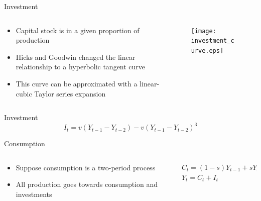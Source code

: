 \documentclass{beamer}
\begin{document}
\begin{frame}{Investment}
	\begin{columns}
		\begin{column}{0.5\textwidth}
				\begin{itemize}
					\item
						Capital stock is in a given proportion of production\autocite{Press1939}

					\item
						Hicks and Goodwin changed the linear relationship to a hyperbolic tangent curve
					\item
						This curve can be approximated with a linear-cubic Taylor series expansion
				\end{itemize}
		\end{column}
		\begin{column}{0.5\textwidth}
			\begin{figure}
				\centering
				\texttt{[image: investment\_curve.eps]}
			\end{figure}
		\end{column}
	\end{columns}
\end{frame}

\begin{frame}{Investment}
	\begin{equation*}
		I_t=v(Y_{t-1}-Y_{t-2})-v(Y_{t-1}-Y_{t-2})^3
	\end{equation*}
\end{frame}

\begin{frame}{Consumption}
	\begin{columns}
		\begin{column}{0.5\textwidth}
			\begin{itemize}
				\item
					Suppose consumption is a two-period process
				\item
					All production goes towards consumption and investments
			\end{itemize}
		\end{column}

		\begin{column}{0.5\textwidth}
			\begin{gather*}
				C_t=(1-s)Y_{t-1}+sY_{t-2}\\
				Y_t=C_t+I_t
			\end{gather*}
		\end{column}
	\end{columns}
\end{frame}
\end{document}
